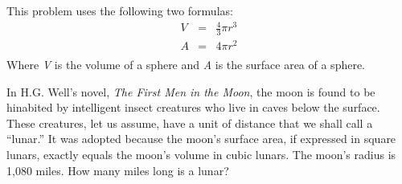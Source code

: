 \question

This problem uses the following two formulas:
\begin{eqnarray*}
  V & = & \frac{4}{3} \pi r^3 \\
  A & = & 4 \pi r^2 \\
\end{eqnarray*}
Where {\em V} is the volume of a sphere and {\em A} is the surface area of a sphere.

In H.G. Well's novel, {\em The First Men in the Moon}, the moon is found to be hinabited by intelligent
insect creatures who live in caves below the surface.  These creatures, let us assume, have a unit of distance that we
shall call a ``lunar.''  It was adopted because the moon's surface area, if expressed in square lunars, exactly equals
the moon's volume in cubic lunars.  The moon's radius is 1,080 miles.  How many miles long is a lunar?

\question
